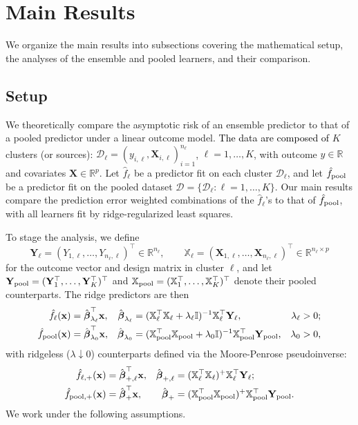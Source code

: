 \documentclass{article}
\theoremstyle{plain}
\theoremstyle{remark}
\def \bx{\mathbf{x}}
\def \bX{\mathbf{X}}
\def \bX{\boldsymbol{X}}
\begin{document}
\section{Main Results}
We organize the main results into subsections covering the mathematical setup, the analyses of the ensemble and pooled learners, and their comparison.

\subsection{Setup}\label{sec:setup}
We theoretically compare the asymptotic risk of an ensemble predictor to that of a pooled predictor under a linear outcome model. \textcolor{black}{The data are composed of} $K$ clusters (or sources): $\mathcal{D}_\ell=(y_{i,\ell},\bX_{i,\ell})_{i=1}^{n_\ell}$, $\ell=1,\ldots,K$, with outcome $y\in\mathbb{R}$ and covariates $\bX\in\mathbb{R}^p$. Let $\hat{f}_\ell$ be a predictor fit on each cluster $\mathcal{D}_\ell$, and let $\hat{f}_{\rm pool}$ be a predictor fit on the pooled dataset $\mathcal{D}=\{\mathcal{D}_\ell:\ell=1,\ldots,K\}$. Our main results compare the prediction error weighted combinations of the $\hat{f}_\ell$'s to that of $\hat{f}_{\rm pool}$, with all learners fit by ridge-regularized least squares.

To stage the analysis, we define
\[
\mathbf{Y}_\ell=(Y_{1,\ell},\ldots,Y_{n_\ell,\ell})^\top\in\mathbb{R}^{n_\ell},
\qquad
\mathbb{X}_\ell=(\bX_{1,\ell},\ldots,\bX_{n_\ell,\ell})^\top\in\mathbb{R}^{n_\ell\times p}
\]
for the outcome vector and design matrix in cluster $\ell$, and let $\mathbf{Y}_{\rm pool}=(\mathbf{Y}_1^\top,\ldots,\mathbf{Y}_K^\top)^\top$ and $\mathbb{X}_{\rm pool}=(\mathbb{X}_1^\top,\ldots,\mathbb{X}_K^\top)^\top$ denote their pooled counterparts. The ridge predictors are then
\begin{align*}
\hat{f}_\ell(\bx)
 &=\hat{\boldsymbol{\beta}}_{\lambda_\ell}^\top\bx,
&\hat{\boldsymbol{\beta}}_{\lambda_\ell}
 &=(\mathbb{X}_\ell^\top\mathbb{X}_\ell+\lambda_\ell\mathbb{I})^{-1}\mathbb{X}_\ell^\top\mathbf{Y}_\ell,
&\lambda_\ell&>0;\\
\hat{f}_{\rm pool}(\bx)
 &=\hat{\boldsymbol{\beta}}_{\lambda_0}^\top\bx,
&\hat{\boldsymbol{\beta}}_{\lambda_0}
 &=(\mathbb{X}_{\rm pool}^\top\mathbb{X}_{\rm pool}+\lambda_0\mathbb{I})^{-1}\mathbb{X}_{\rm pool}^\top\mathbf{Y}_{\rm pool},
&\lambda_0&>0,
\end{align*}
with ridgeless ($\lambda\downarrow 0$) counterparts defined via the Moore-Penrose pseudoinverse:
\begin{align*}
\hat{f}_{\ell,+}(\bx)
 &=\hat{\boldsymbol{\beta}}_{+,\ell}^\top\bx,
&\hat{\boldsymbol{\beta}}_{+,\ell}
 &=(\mathbb{X}_\ell^\top\mathbb{X}_\ell)^+\mathbb{X}_\ell^\top\mathbf{Y}_\ell;\\
\hat{f}_{\rm pool,+}(\bx)
 &=\hat{\boldsymbol{\beta}}_{+}^\top\bx,
&\hat{\boldsymbol{\beta}}_{+}
 &=(\mathbb{X}_{\rm pool}^\top\mathbb{X}_{\rm pool})^+\mathbb{X}_{\rm pool}^\top\mathbf{Y}_{\rm pool}.
\end{align*}
We work under the following assumptions.
\end{document}

